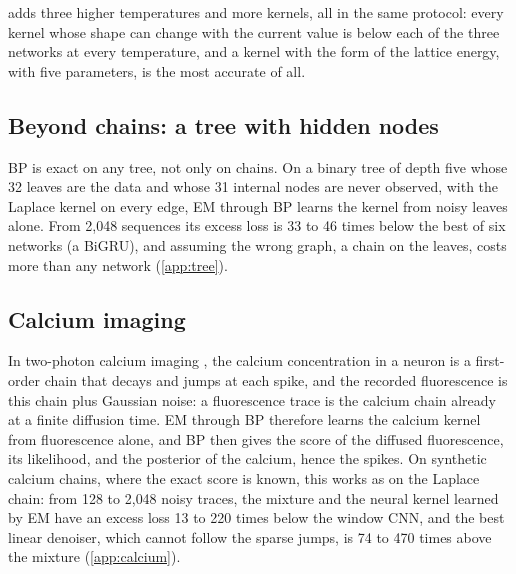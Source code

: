 \documentclass{article}
\begin{document}
 adds three higher temperatures and more kernels, all in the same protocol: every kernel whose shape can
change with the current value is below each of the three networks at every temperature, and a kernel with the form of
the lattice energy, with five parameters, is the most accurate of all.

\subsection{Beyond chains: a tree with hidden nodes}
\label{sec:tree-hidden}

BP is exact on any tree, not only on chains. On a binary tree of depth five whose 32 leaves are the data and whose 31
internal nodes are never observed, with the Laplace kernel on every edge, EM through BP learns the kernel from noisy
leaves alone. From 2{,}048 sequences its excess loss is 33 to 46 times below the best of six networks (a BiGRU), and
assuming the wrong graph, a chain on the leaves, costs more than any network (\cref{app:tree}).

\subsection{Calcium imaging}
\label{sec:calcium}

In two-photon calcium imaging \cite{vogelstein2009spike,friedrich2017fast,berens2018community}, the calcium
concentration in a neuron is a first-order chain that decays and jumps at each spike, and the recorded fluorescence is
this chain plus Gaussian noise: a fluorescence trace is the calcium chain already at a finite diffusion time. EM through
BP therefore learns the calcium kernel from fluorescence alone, and BP then gives the score of the diffused
fluorescence, its likelihood, and the posterior of the calcium, hence the spikes. On synthetic calcium chains, where
the exact score is known, this works as on the Laplace chain: from 128 to 2{,}048 noisy traces, the mixture and the
neural kernel learned by EM have an excess loss 13 to 220 times below the window CNN, and the best linear denoiser,
which cannot follow the sparse jumps, is 74 to 470 times above the mixture (\cref{app:calcium}).
\end{document}
